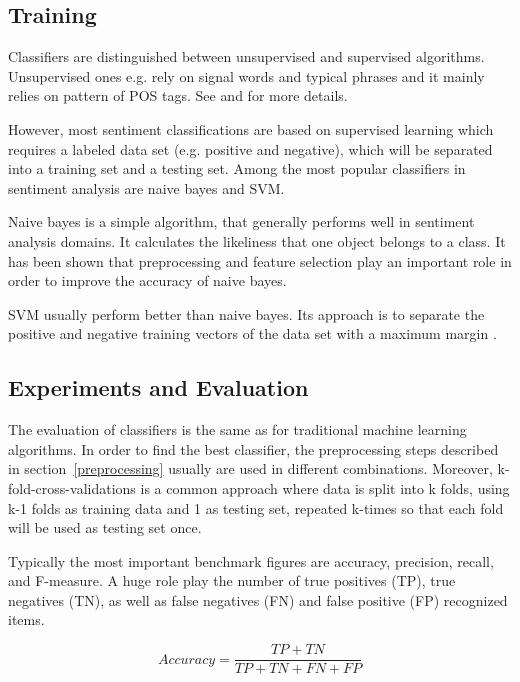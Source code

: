 \documentclass{acm_proc_article-sp}
\begin{document}
\subsection{Training}
Classifiers are distinguished between unsupervised and supervised algorithms. Unsupervised ones e.g. rely on signal words and typical phrases and it mainly relies on pattern of POS tags. See \cite{liu2010sentimentanalysis} and \cite{pang2008opinion} for more details.

However, most sentiment classifications are based on supervised learning which requires a labeled data set (e.g. positive and negative), which will be separated into a training set and a testing set. Among the most popular classifiers in sentiment analysis are naive bayes and SVM. 

Naive bayes is a simple algorithm, that generally performs well in sentiment analysis domains. It calculates the likeliness that one object belongs to a class. It has been shown that preprocessing and feature selection play an important role in order to improve the accuracy of naive bayes.
\cite{ye2009sentiment, ting2011naive}

SVM usually perform better than naive bayes. Its approach is to separate the positive and negative training vectors of the data set with a maximum margin  \cite{ye2009sentiment}.

\subsection{Experiments and Evaluation}
The evaluation of classifiers is the same as for traditional machine learning algorithms. In order to find the best classifier, the preprocessing steps described in section~\ref{preprocessing} usually are used in different combinations. Moreover, k-fold-cross-validations is a common approach where data is split into k folds, using k-1 folds as training data and 1 as testing set, repeated k-times so that each fold will be used as testing set once. 

 Typically the most important benchmark figures are accuracy, precision, recall, and F-measure. A huge role play the number of true positives (TP), true negatives (TN), as well as false negatives (FN) and false positive (FP) recognized items. 
\cite{haddi2013therole, ting2011naive, sokolova2006beyond, pak2010twitter, ye2009sentiment}


\begin{equation}
Accuracy = \frac{TP+TN}{TP+TN+FN+FP}
\end{equation}
\end{document}
